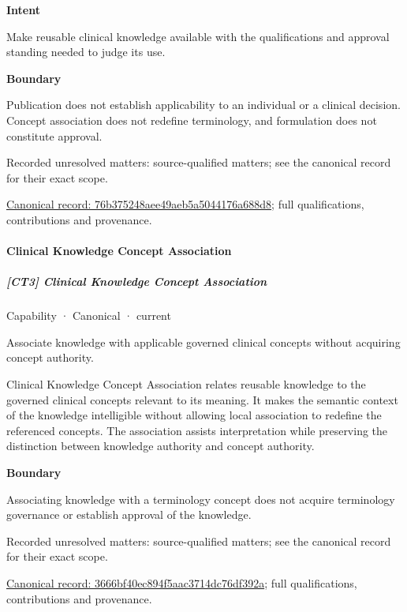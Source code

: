 \textbf{Intent}



Make reusable clinical knowledge available with the qualifications and approval standing needed to judge its use.



\textbf{Boundary}



Publication does not establish applicability to an individual or a clinical decision. Concept association does not redefine terminology, and formulation does not constitute approval.


{\small Recorded unresolved matters: source-qualified matters; see the canonical record for their exact scope.}\par
{\footnotesize \href{../../../../continuum/strategy/capability/76b375248aee49aeb5a5044176a688d8.md}{Canonical record: 76b375248aee49aeb5a5044176a688d8}; full qualifications, contributions and provenance.}\par
\paragraph{Clinical Knowledge Concept Association}

\subparagraph{[CT3] Clinical Knowledge Concept Association}

\label{element:3666bf40ec894f5aac3714dc76df392a}
{\small Capability · Canonical · current}\par

Associate knowledge with applicable governed clinical concepts without acquiring concept authority.



Clinical Knowledge Concept Association relates reusable knowledge to the governed clinical concepts relevant to its meaning. It makes the semantic context of the knowledge intelligible without allowing local association to redefine the referenced concepts. The association assists interpretation while preserving the distinction between knowledge authority and concept authority.



\textbf{Boundary}



Associating knowledge with a terminology concept does not acquire terminology governance or establish approval of the knowledge.


{\small Recorded unresolved matters: source-qualified matters; see the canonical record for their exact scope.}\par
{\footnotesize \href{../../../../continuum/strategy/capability/3666bf40ec894f5aac3714dc76df392a.md}{Canonical record: 3666bf40ec894f5aac3714dc76df392a}; full qualifications, contributions and provenance.}\par
